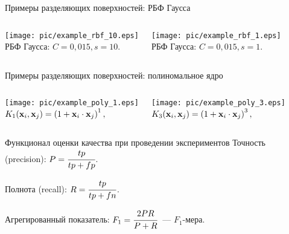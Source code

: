 \documentclass[unicode,lefteqn,c,hyperref={pdfpagelabels=false}]{beamer}
\begin{document}
\begin{frame}{Примеры разделяющих поверхностей: РБФ Гаусса}
	\begin{columns}
			\begin{center}
			\texttt{[image: pic/example\_rbf\_10.eps]}\\
			РБФ Гаусса: $C = 0{,}015, s=10.$
			\end{center}	
			\begin{center}
			\texttt{[image: pic/example\_rbf\_1.eps]}\\
			РБФ Гаусса: $C = 0{,}015, s=1.$
			\end{center}	
	\end{columns}
\end{frame}

\begin{frame}{Примеры разделяющих поверхностей: полиномальное ядро}
	\begin{columns}
	 	\column{0.5\textwidth}
			\begin{center}
			\texttt{[image: pic/example\_poly\_1.eps]}\\
			$K_1(\boldsymbol{\mathbf{x}}_i, \boldsymbol{\mathbf{x}}_j) = \left(1 + \boldsymbol{\mathbf{x}}_i \cdot \boldsymbol{\mathbf{x}}_j\right)^1,$
			\end{center}	
		\column{0.5\textwidth}
			\begin{center}
			\texttt{[image: pic/example\_poly\_3.eps]}\\
			$K_3(\boldsymbol{\mathbf{x}}_i, \boldsymbol{\mathbf{x}}_j) = \left(1 + \boldsymbol{\mathbf{x}}_i \cdot \boldsymbol{\mathbf{x}}_j\right)^3,$
			\end{center}	
	\end{columns}
\end{frame}


\begin{frame}{Функционал оценки качества при проведении экспериментов}
	Точность (precision): $P = \cfrac{tp}{tp+fp}$.

	Полнота (recall): $R = \cfrac{tp}{tp+fn}$. 

	Агрегированный показатель: $F_1 = \cfrac{2PR}{P+R}$~--- $F_1$-мера.
\end{frame}
\end{document}
